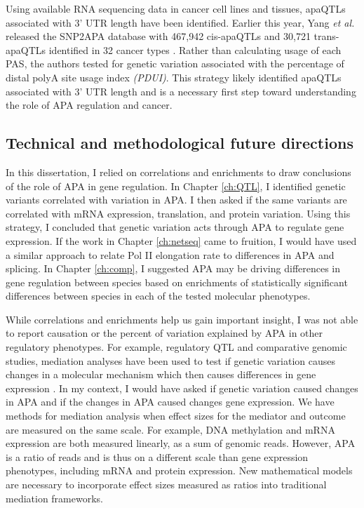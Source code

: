  
Using available RNA sequencing data in cancer cell lines and tissues, apaQTLs associated with 3' UTR length have been identified. Earlier this year, Yang \emph{et al.} released the SNP2APA database with 467,942 cis-apaQTLs and 30,721 trans-apaQTLs identified in 32 cancer types \citep{yang_snp2apa_2020}. Rather than calculating usage of each PAS, the authors tested for genetic variation associated with the percentage of distal polyA site usage index \emph{(PDUI)}. This strategy likely identified apaQTLs associated with 3' UTR length and is a necessary first step toward understanding the role of APA regulation and cancer. 



\subsection{Technical and methodological future directions}

In this dissertation, I relied on correlations and enrichments to draw conclusions of the role of APA in gene regulation. In Chapter \ref{ch:QTL}, I identified genetic variants correlated with variation in APA. I then asked if the same variants are correlated with mRNA expression, translation, and protein variation. Using this strategy, I concluded that genetic variation acts through APA to regulate gene expression. If the work in Chapter \ref{ch:netseq} came to fruition, I would have used a similar approach to relate Pol II elongation rate to differences in APA and splicing. In Chapter \ref{ch:comp}, I suggested APA may be driving differences in gene regulation between species based on enrichments of statistically significant differences between species in each of the tested molecular phenotypes. 

While correlations and enrichments help us gain important insight, I was not able to report causation or the percent of variation explained by APA in other regulatory phenotypes. For example, regulatory QTL and comparative genomic studies, mediation analyses have been used to test if genetic variation causes changes in a molecular mechanism which then causes differences in gene expression \citep{pierce_co-occurring_2018, park_bayesian_2017, blake_comparison_2020, eres_reorganization_2019}. In my context, I would have asked if genetic variation caused changes in APA and if the changes in APA caused changes gene expression. We have methods for mediation analysis when effect sizes for the mediator and outcome are measured on the same scale. For example, DNA methylation and mRNA expression are both measured linearly, as a sum of genomic reads. However, APA is a ratio of reads and is thus on a different scale than gene expression phenotypes, including mRNA and protein expression. New mathematical models are necessary to incorporate effect sizes measured as ratios into traditional mediation frameworks. 

